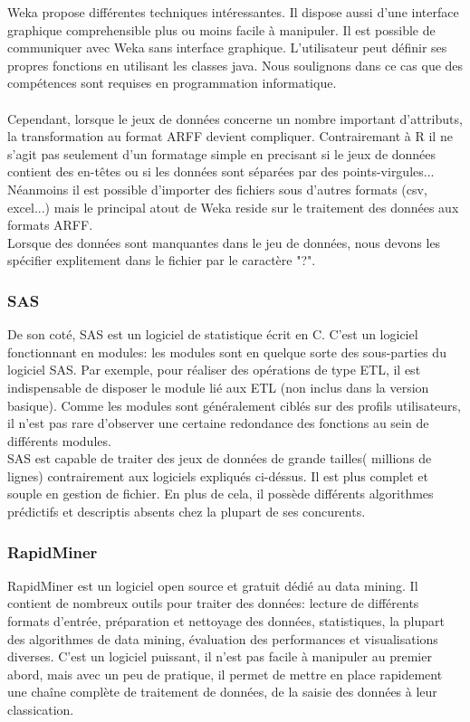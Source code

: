 \documentclass[11pt,a4paper]{report}
\begin{document}
Weka propose différentes techniques intéressantes. Il dispose aussi d'une interface graphique comprehensible plus ou moins facile à manipuler. Il est possible de communiquer avec Weka sans interface graphique. L'utilisateur peut définir ses propres fonctions en utilisant les classes java. Nous soulignons dans ce cas que  des compétences sont requises en programmation informatique. \\\\

Cependant, lorsque le jeux de données concerne un nombre important d'attributs, la transformation au format ARFF devient compliquer. Contrairemant à R il ne s'agit pas seulement d'un formatage simple en precisant si le jeux de données contient des en-têtes ou si les données sont séparées par des points-virgules... Néanmoins il est possible d'importer des fichiers sous d'autres formats (csv, excel...) mais le principal atout de Weka reside sur le traitement des données aux formats ARFF. \\
Lorsque des données sont manquantes dans le jeu de données, nous devons les spécifier explitement dans le fichier par le caractère "?".



\subsubsection{SAS}
De son coté, SAS est un logiciel de statistique écrit en C. C'est un logiciel fonctionnant en modules: les modules sont en quelque sorte des sous-parties du logiciel SAS.
Par exemple, pour réaliser des opérations de type ETL, il est indispensable de disposer le module lié aux ETL (non inclus dans la version basique).
Comme les modules sont généralement ciblés sur des profils utilisateurs, il n'est pas rare d'observer une certaine redondance des fonctions au sein de différents modules. \\ SAS est capable de traiter des jeux de données de grande tailles( millions de lignes) contrairement aux logiciels expliqués ci-déssus. Il est plus complet et souple en gestion de fichier. En plus de cela, il possède différents algorithmes prédictifs et descriptis absents chez la plupart de ses concurents.   

\subsubsection{RapidMiner}

RapidMiner est un logiciel open source et gratuit dédié au data mining. Il contient de nombreux outils pour traiter des données: lecture de différents formats d'entrée, préparation et nettoyage des données, statistiques, la plupart des algorithmes de data mining, évaluation des performances et visualisations diverses.
C'est un logiciel puissant, il n'est pas facile à manipuler au premier abord, mais avec un peu de pratique, il permet de mettre en place rapidement une chaîne complète de traitement de données, de la saisie des données à leur classication.\\\\ 
\end{document}
